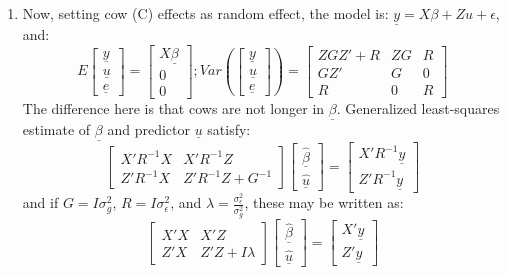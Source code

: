 \documentclass[12pt,a4paper]{paper}
\begin{document}
\begin{enumerate}
\item Now, setting cow (C) effects as random effect, the model is: $\underline{y} = X\beta + Zu + \epsilon$, and: \[E\left[\begin{array}{c}\underline{y}\\\underline{u}\\\underline{e}\end{array}\right] = \left[\begin{array}{c}X\underline{\beta}\\0\\0\end{array}\right]; Var\left(\left[\begin{array}{c}\underline{y}\\\underline{u}\\\underline{e}\end{array}\right]\right) = \left[\begin{array}{ccc}ZGZ' + R & ZG & R\\GZ' & G & 0\\R & 0 & R\end{array}\right]\] The difference here is that cows are not longer in $\underline{\beta}$. Generalized least-squares estimate of $\underline{\beta}$ and predictor $\underline{u}$ satisfy: \[\left[\begin{array}{cc} X'R^{-1}X & X'R^{-1}Z\\Z'R^{-1}X & Z'R^{-1}Z + G^{-1}\end{array}\right]\left[\begin{array}{c}\underline{\hat{\beta}}\\\underline{\hat{u}}\end{array}\right] = \left[\begin{array}{c}X'R^{-1}\underline{y}\\Z'R^{-1}\underline{y}\end{array}\right]\]
and if $G = I\sigma^{2}_{g}$, $R = I\sigma_{\epsilon}^{2}$, and $\lambda = \frac{\sigma^{2}_{\epsilon}}{\sigma^{2}_{g}}$, these may be written as: 
\[\left[\begin{array}{cc} X'X & X'Z\\Z'X & Z'Z + I\lambda\end{array}\right]\left[\begin{array}{c}\underline{\hat{\beta}}\\\underline{\hat{u}}\end{array}\right] = \left[\begin{array}{c}X'\underline{y}\\Z'\underline{y}\end{array}\right]\]

\end{enumerate}
\end{document}
